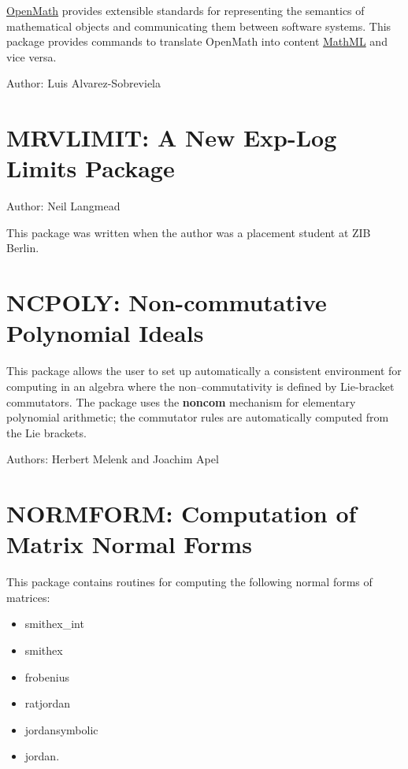 \href{https://openmath.org/}{OpenMath} provides extensible standards
for representing the semantics of mathematical objects and
communicating them between software systems.  This package provides
commands to translate OpenMath into content
\href{https://www.w3.org/Math/}{MathML} and vice versa.

Author: Luis Alvarez-Sobreviela



\newpage

\section{MRVLIMIT: A New Exp-Log Limits Package}

Author: Neil Langmead

This package was written when the author was a placement student at ZIB Berlin.



\newpage

\section{NCPOLY: Non-commutative Polynomial Ideals}

This package allows the user to set up automatically a consistent
environment for computing in an algebra where the non--commutativity is
defined by Lie-bracket commutators.  The package uses the {\REDUCE} \textbf{noncom}
mechanism for elementary polynomial arithmetic; the commutator
rules are automatically computed from the Lie brackets.

Authors: Herbert Melenk and Joachim Apel



\newpage

\section[NORMFORM: Computation of Matrix Normal Forms]{NORMFORM: Computation of\\Matrix Normal Forms}
\label{NORMFORM}

This package contains routines for computing the following
normal forms of matrices:
\begin{itemize}
\item smithex\_int
\item smithex
\item frobenius
\item ratjordan
\item jordansymbolic
\item jordan.
\end{itemize}

